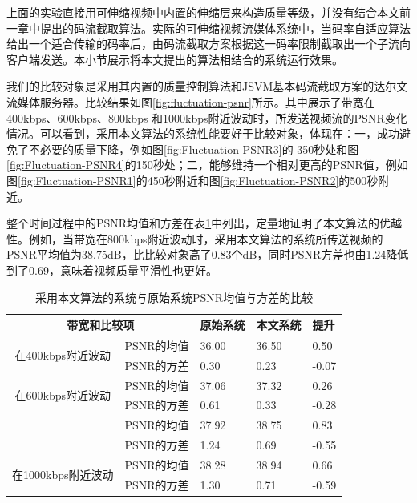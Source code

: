 上面的实验直接用可伸缩视频中内置的伸缩层来构造质量等级，并没有结合本文前一章中提出的码流截取算法。实际的可伸缩视频流媒体系统中，当码率自适应算法给出一个适合传输的码率后，由码流截取方案根据这一码率限制截取出一个子流向客户端发送。本小节展示将本文提出的算法相结合的系统运行效果。

我们的比较对象是采用其内置的质量控制算法和JSVM基本码流截取方案的达尔文流媒体服务器。比较结果如图\ref{fig:fluctuation-psnr}所示。其中展示了带宽在400kbps、600kbps、800kbps
和1000kbps附近波动时，所发送视频流的PSNR变化情况。可以看到，采用本文算法的系统性能要好于比较对象，体现在：一，成功避免了不必要的质量下降，例如图\ref{fig:Fluctuation-PSNR3}的
350秒处和图\ref{fig:Fluctuation-PSNR4}的150秒处；二，能够维持一个相对更高的PSNR值，例如图\ref{fig:Fluctuation-PSNR1}的450秒附近和图\ref{fig:Fluctuation-PSNR2}的500秒附近。

整个时间过程中的PSNR均值和方差在表\ref{tab:improvement-combined}中列出，定量地证明了本文算法的优越性。例如，当带宽在800kbps附近波动时，采用本文算法的系统所传送视频的PSNR平均值为38.75dB，比比较对象高了0.83个dB，同时PSNR方差也由1.24降低到了0.69，意味着视频质量平滑性也更好。

\begin{table}[!h]
	\centering
	\caption{采用本文算法的系统与原始系统PSNR均值与方差的比较}
	\label{tab:improvement-combined}
	\small
	\begin{minipage}{1.0\linewidth}
		\centering
		\begin{tabular}{c|c|*{2}{p{2.0cm}<{\centering}|}p{2.0cm}<{\centering}}
			\hline \hline
			\multicolumn{2}{c|}{带宽和比较项} &
			{原始系统} & {本文系统} & {提升} \\ \hline 
			\multirow{2}{*}{在400kbps附近波动}
			& PSNR的均值
			& 36.00 & 36.50 & 0.50 \\ \cline{2-5}
			& PSNR的方差
			& 0.30 & 0.23 & -0.07 \\ \hline
			\multirow{2}{*}{在600kbps附近波动}
			& PSNR的均值 & 37.06 & 37.32 & 0.26 \\ \cline{2-5}
			& PSNR的方差 & 0.61 & 0.33 & -0.28 \\ \Xhline{2\arrayrulewidth}
			\multirow{2}{*}{在800kbps附近波动}
			& PSNR的均值 & 37.92 & 38.75 & 0.83 \\ \cline{2-5}
			& PSNR的方差 & 1.24 & 0.69 & -0.55 \\ \hline
			\multirow{2}{*}{在1000kbps附近波动}
			& PSNR的均值 & 38.28 & 38.94 & 0.66 \\ \cline{2-5}
			& PSNR的方差 & 1.30 & 0.71 & -0.59 \\ \hline
		\end{tabular}
	\end{minipage}
\end{table}

